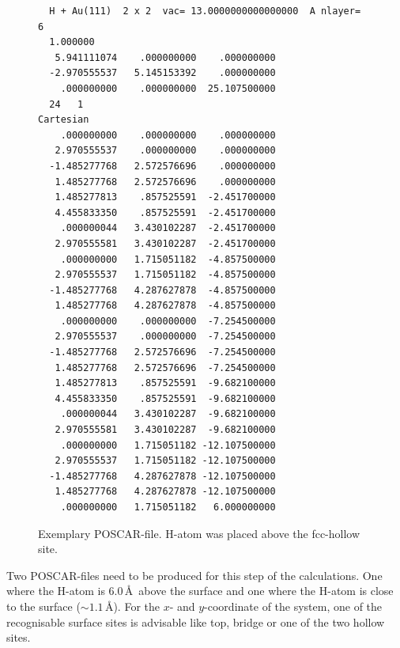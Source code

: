 \documentclass[twoside, 11pt, titlepage, captions=nooneline, a4paper, headsepline]{scrbook}%
\begin{document}
\begin{figure}[h!!]
\begin{verbatim}
  H + Au(111)  2 x 2  vac= 13.0000000000000000  A nlayer=  6 
  1.000000
   5.941111074    .000000000    .000000000
  -2.970555537   5.145153392    .000000000
    .000000000    .000000000  25.107500000
  24   1
Cartesian
    .000000000    .000000000    .000000000
   2.970555537    .000000000    .000000000
  -1.485277768   2.572576696    .000000000
   1.485277768   2.572576696    .000000000
   1.485277813    .857525591  -2.451700000
   4.455833350    .857525591  -2.451700000
    .000000044   3.430102287  -2.451700000
   2.970555581   3.430102287  -2.451700000
    .000000000   1.715051182  -4.857500000
   2.970555537   1.715051182  -4.857500000
  -1.485277768   4.287627878  -4.857500000
   1.485277768   4.287627878  -4.857500000
    .000000000    .000000000  -7.254500000
   2.970555537    .000000000  -7.254500000
  -1.485277768   2.572576696  -7.254500000
   1.485277768   2.572576696  -7.254500000
   1.485277813    .857525591  -9.682100000
   4.455833350    .857525591  -9.682100000
    .000000044   3.430102287  -9.682100000
   2.970555581   3.430102287  -9.682100000
    .000000000   1.715051182 -12.107500000
   2.970555537   1.715051182 -12.107500000
  -1.485277768   4.287627878 -12.107500000
   1.485277768   4.287627878 -12.107500000
    .000000000   1.715051182   6.000000000

\end{verbatim}
\caption{Exemplary POSCAR-file. H-atom was placed above the fcc-hollow site.}
\label{cpos}
\end{figure}
\clearpage
Two POSCAR-files need to be produced for this step of the calculations. One where the H-atom is 6.0\,\AA~above the surface and one where the H-atom is close to the surface ($\sim 1.1$\,\AA). For the $x$- and $y$-coordinate of the system, one of the recognisable surface sites is advisable like top, bridge or one of the two hollow sites.\\
\end{document}
